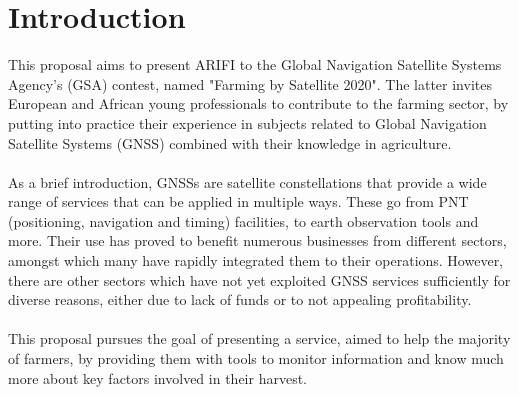 \section{Introduction}
This proposal aims to present ARIFI to the Global Navigation Satellite Systems Agency's (GSA) contest, named "Farming by Satellite 2020". The latter invites European and African young professionals to contribute to the farming sector, by putting into practice their experience in subjects related to Global Navigation Satellite Systems (GNSS) combined with their knowledge in agriculture.\\\\%
%
%
As a brief introduction, GNSSs are satellite constellations that provide a wide range of services that can be applied in multiple ways. These go from PNT (positioning, navigation and timing) facilities, to earth observation tools and more. Their use has proved to benefit numerous businesses from different sectors, amongst which many have rapidly integrated them to their operations. However, there are other sectors which have not yet exploited GNSS services sufficiently for diverse reasons, either due to lack of funds or to not appealing profitability.\\\\
% 
%
This proposal pursues the goal of presenting a service, aimed to help the majority of farmers, by providing them with tools to monitor information and know much more about key factors involved in their harvest.

